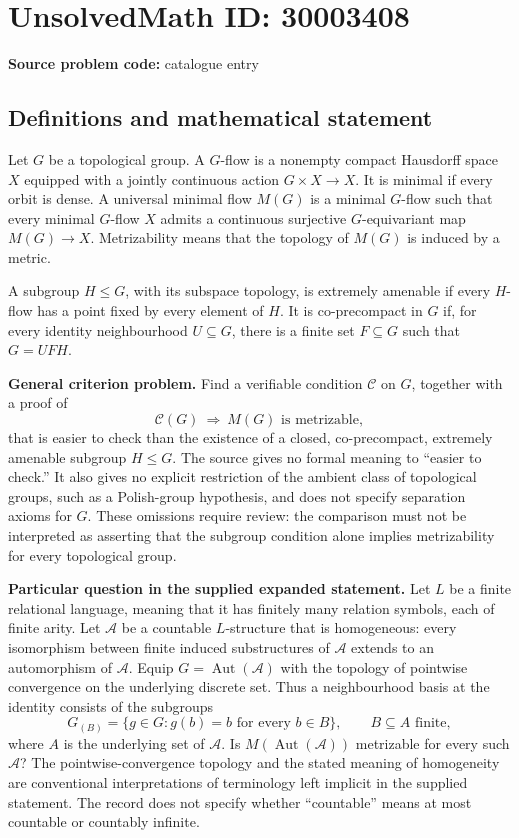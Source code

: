 \documentclass[11pt]{article}
\begin{document}
\section*{UnsolvedMath ID: 30003408}
\textbf{Source problem code:} catalogue entry
\subsection{Definitions and mathematical statement}
Let \(G\) be a topological group. A \(G\)-flow is a nonempty compact Hausdorff space \(X\) equipped with a jointly continuous action \(G\times X\to X\). It is minimal if every orbit is dense. A universal minimal flow \(M(G)\) is a minimal \(G\)-flow such that every minimal \(G\)-flow \(X\) admits a continuous surjective \(G\)-equivariant map \(M(G)\to X\). Metrizability means that the topology of \(M(G)\) is induced by a metric.

A subgroup \(H\leq G\), with its subspace topology, is extremely amenable if every \(H\)-flow has a point fixed by every element of \(H\). It is co-precompact in \(G\) if, for every identity neighbourhood \(U\subseteq G\), there is a finite set \(F\subseteq G\) such that \(G=UFH\).

\textbf{General criterion problem.} Find a verifiable condition \(\mathcal C\) on \(G\), together with a proof of
\[
\mathcal C(G)\ \Longrightarrow\ M(G)\text{ is metrizable},
\]
that is easier to check than the existence of a closed, co-precompact, extremely amenable subgroup \(H\leq G\). The source gives no formal meaning to ``easier to check.'' It also gives no explicit restriction of the ambient class of topological groups, such as a Polish-group hypothesis, and does not specify separation axioms for \(G\). These omissions require review: the comparison must not be interpreted as asserting that the subgroup condition alone implies metrizability for every topological group.

\textbf{Particular question in the supplied expanded statement.} Let \(L\) be a finite relational language, meaning that it has finitely many relation symbols, each of finite arity. Let \(\mathcal A\) be a countable \(L\)-structure that is homogeneous: every isomorphism between finite induced substructures of \(\mathcal A\) extends to an automorphism of \(\mathcal A\). Equip \(G=\operatorname{Aut}(\mathcal A)\) with the topology of pointwise convergence on the underlying discrete set. Thus a neighbourhood basis at the identity consists of the subgroups
\[
G_{(B)}=\{g\in G: g(b)=b\text{ for every }b\in B\},
\qquad B\subseteq A\text{ finite},
\]
where \(A\) is the underlying set of \(\mathcal A\). Is \(M(\operatorname{Aut}(\mathcal A))\) metrizable for every such \(\mathcal A\)? The pointwise-convergence topology and the stated meaning of homogeneity are conventional interpretations of terminology left implicit in the supplied statement. The record does not specify whether ``countable'' means at most countable or countably infinite.
\end{document}
